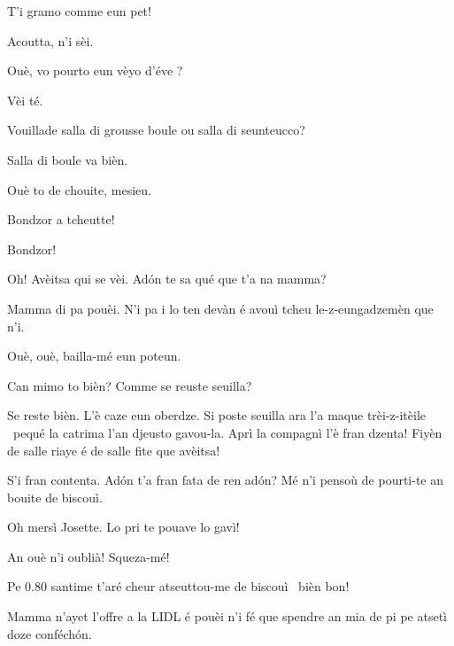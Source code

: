 \begin{drama}
\Casimirspeaks {} T'i gramo comme eun pet!

\PersEmpourtantaspeaks {} Acoutta, n’i sèi.

\Eunfeurmispeaks Ouè,  vo pourto eun vèyo d'éve \bicchiere ?

\PersEmpourtantaspeaks Vèi té.

\Eunfeurmispeaks Vouillade salla di grousse boule ou salla di seunteucco?

\PersEmpourtantaspeaks Salla di boule va bièn.

\Eunfeurmispeaks Ouè to de chouite, mesieu.


\Feliespeaks Bondzor a tcheutte!

\Casimirspeaks {} Bondzor!

\Gerominespeaks Oh! Avèitsa qui se vèi. Ad\'on te sa qué que t’a na mamma?

\Feliespeaks Mamma di pa pouèi. N’i pa i lo ten devàn é avouì tcheu le-z-eungadzemèn que n'i.

\Gerominespeaks Ouè, ouè, bailla-mé eun poteun.


\Feliespeaks Can mimo to bièn? Comme se reuste seuilla?

\Gerominespeaks {} Se reste bièn. L’è caze eun oberdze. Si poste seuilla ara l’a maque trèi-z-itèile \stella\ pequé la catrima l’an djeusto gavou-la.  Aprì la compagnì l’è fran dzenta! Fiyèn de salle riaye é de salle fite que avèitsa!

\Feliespeaks S’i fran contenta. Ad\'on t’a fran fata de ren ad\'on? Mé n'i pensoù de pourti-te an bouite de biscouì.

\Gerominespeaks Oh mersì Josette.  Lo pri te pouave lo gavì!

\Feliespeaks An ouè n’i oublià! Squeza-mé!

\Gerominespeaks Pe $0.80$ santime t’aré cheur atseuttou-me de biscouì \biscotto\ bièn bon!

\Feliespeaks Mamma n’ayet l’offre a la LIDL é pouèi n’i fé que spendre an mia de pi pe atsetì doze conféch\'on.


\end{drama}
